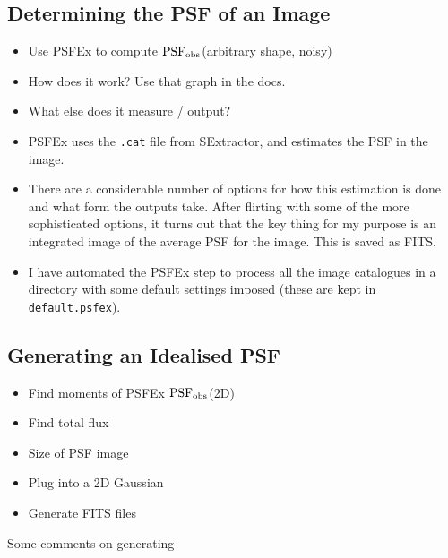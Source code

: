 \documentclass[letterpaper, 11pt]{article}
\def\psfobs{\ensuremath{{\rm PSF_{obs}}}\xspace}
\begin{document}
\subsection{Determining the PSF of an Image}
\label{sec:psfex}

\begin{itemize}
	\item Use PSFEx to compute \psfobs (arbitrary shape, noisy)
	\item How does it work? Use that graph in the docs.
	\item What else does it measure / output?
\end{itemize}

\vspace{1cm}

\begin{itemize}
	\item PSFEx uses the \texttt{.cat} file from SExtractor, and estimates the PSF in the image.
	\item There are a considerable number of options for how this estimation is done and what form the outputs take. After flirting with some of the more sophisticated options, it turns out that the key thing for my purpose is an integrated image of the average PSF for the image. This is saved as FITS.
	\item I have automated the PSFEx step to process all the image catalogues in a directory with some default settings imposed (these are kept in \texttt{default.psfex}).
\end{itemize}

\subsection{Generating an Idealised PSF}

\begin{itemize}
	\item Find moments of PSFEx \psfobs (2D)
	\item Find total flux
	\item Size of PSF image
	\item Plug into a 2D Gaussian 
	\item Generate FITS files
\end{itemize}

Some comments on generating 
\end{document}
